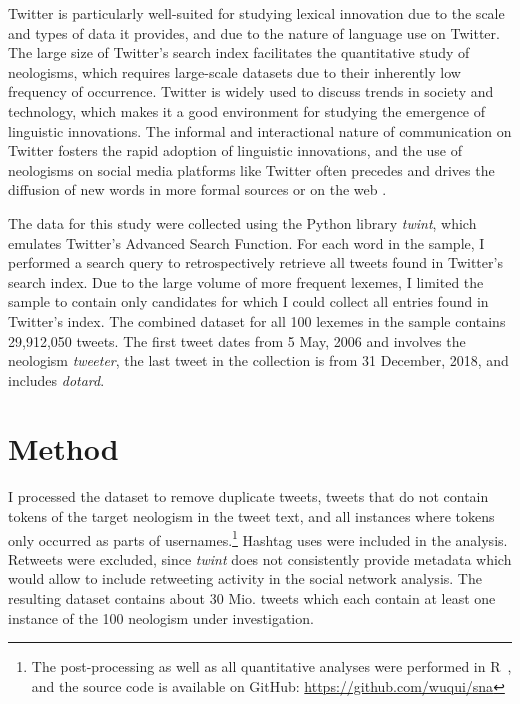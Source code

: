 \documentclass[
  a4paper,
  abstract=on,
  captions=tableabove
  ]{scrartcl}
\begin{document}
    Twitter is particularly well-suited for studying lexical innovation due to the scale and types of data it provides, and due to the nature of language use on Twitter. The large size of Twitter's search index facilitates the quantitative study of neologisms, which requires large-scale datasets due to their inherently low frequency of occurrence. Twitter is widely used to discuss trends in society and technology, which makes it a good environment for studying the emergence of linguistic innovations. The informal and interactional nature of communication on Twitter fosters the rapid adoption of linguistic innovations, and the use of neologisms on social media platforms like Twitter often precedes and drives the diffusion of new words in more formal sources or on the web \parencite{Wurschinger2016UsingWeb}.


    The data for this study were collected using the Python library \emph{twint}, which emulates Twitter's Advanced Search Function. For each word in the sample, I performed a search query to retrospectively retrieve all tweets found in Twitter's search index. Due to the large volume of more frequent lexemes, I limited the sample to contain only candidates for which I could collect all entries found in Twitter's index. The combined dataset for all 100 lexemes in the sample contains 29,912,050 tweets. The first tweet dates from 5 May, 2006 and involves the neologism \emph{tweeter}, the last tweet in the collection is from 31 December, 2018, and includes \emph{dotard}.

\section{Method}
  \label{sec:method}

  I processed the dataset to remove duplicate tweets, tweets that do not contain tokens of the target neologism in the tweet text, and all instances where tokens only occurred as parts of usernames.\footnote{The post-processing as well as all quantitative analyses were performed in R~\parencite{RCoreTeam2018LanguageEnvironment}, and the source code is available on GitHub: \url{https://github.com/wuqui/sna}} Hashtag uses were included in the analysis. Retweets were excluded, since \emph{twint} does not consistently provide metadata which would allow to include retweeting activity in the social network analysis. The resulting dataset contains about 30 Mio. tweets which each contain at least one instance of the 100 neologism under investigation.
\end{document}
